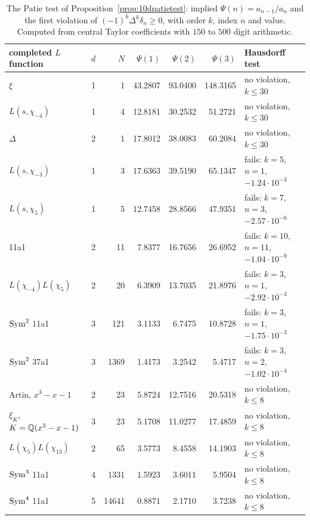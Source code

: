 \begin{table}[t]
\centering\footnotesize
\setlength{\tabcolsep}{2.5pt}
\begin{tabular}{lrrrrrl}
\toprule
completed $L$ function & $d$ & $N$ & $\Psi(1)$ & $\Psi(2)$ & $\Psi(3)$ & Hausdorff test\\
\midrule
$\xi$ & 1 & 1 & 43.2807 & 93.0400 & 148.3165 & no violation, $k\le30$\\
$L(s,\chi_{-4})$ & 1 & 4 & 12.8181 & 30.2532 & 51.2721 & no violation, $k\le30$\\
$\Delta$ & 2 & 1 & 17.8012 & 38.0083 & 60.2084 & no violation, $k\le30$\\
$L(s,\chi_{-3})$ & 1 & 3 & 17.6363 & 39.5190 & 65.1347 & fails: $k=5$, $n=1$, $-1.24\cdot10^{-3}$\\
$L(s,\chi_5)$ & 1 & 5 & 12.7458 & 28.8566 & 47.9351 & fails: $k=7$, $n=3$, $-2.57\cdot10^{-6}$\\
11a1 & 2 & 11 & 7.8377 & 16.7656 & 26.6952 & fails: $k=10$, $n=11$, $-1.04\cdot10^{-9}$\\
$L(\chi_{-4})L(\chi_5)$ & 2 & 20 & 6.3909 & 13.7035 & 21.8976 & fails: $k=3$, $n=1$, $-2.92\cdot10^{-3}$\\
$\operatorname{Sym}^2$ 11a1 & 3 & 121 & 3.1133 & 6.7475 & 10.8728 & fails: $k=3$, $n=1$, $-1.75\cdot10^{-3}$\\
$\operatorname{Sym}^2$ 37a1 & 3 & 1369 & 1.4173 & 3.2542 & 5.4717 & fails: $k=3$, $n=2$, $-1.02\cdot10^{-4}$\\
Artin, $x^3-x-1$ & 2 & 23 & 5.8724 & 12.7516 & 20.5318 & no violation, $k\le8$\\
$\xi_K$, $K = \mathbb{Q}(x^3-x-1)$ & 3 & 23 & 5.1708 & 11.0277 & 17.4859 & no violation, $k\le8$\\
$L(\chi_5)L(\chi_{13})$ & 2 & 65 & 3.5773 & 8.4558 & 14.1903 & no violation, $k\le8$\\
$\operatorname{Sym}^3$ 11a1 & 4 & 1331 & 1.5923 & 3.6011 & 5.9504 & no violation, $k\le8$\\
$\operatorname{Sym}^4$ 11a1 & 5 & 14641 & 0.8871 & 2.1710 & 3.7238 & no violation, $k\le8$\\
\bottomrule
\end{tabular}
\caption{The Patie test of Proposition~\ref{prop:10dpatietest}: implied $\Psi(n) = a_{n-1}/a_n$ and the first violation of $(-1)^k\Delta^k\delta_n\ge0$, with order $k$, index $n$ and value. Computed from central Taylor coefficients with $150$ to $500$ digit arithmetic.}\label{tab:10dpatie}
\end{table}


